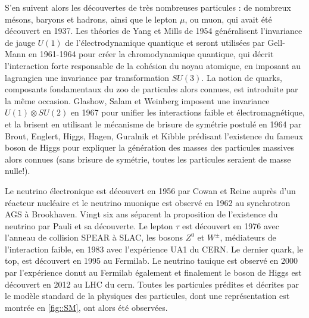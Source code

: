       S'en suivent alors les découvertes de très nombreuses particules : de nombreux mésons, baryons et  hadrons, ainsi que le lepton $\mu$, ou muon, qui avait été découvert en 1937\cite{Street1937}. Les théories de Yang et Mills de 1954\cite{Yang1954} généralisent l'invariance de jauge $U(1)$ de l'électrodynamique quantique et seront utilisées par Gell-Mann en 1961-1964\cite{Glashow1961,Gell-Mann1964} pour créer la chromodynamique quantique, qui décrit l'interaction forte responsable de la cohésion du noyau atomique, en imposant au lagrangien une invariance par transformation $SU(3)$. La notion de quarks, composants fondamentaux du zoo de particules alors connues, est introduite par la même occasion. Glashow, Salam et Weinberg imposent une invariance $U(1)\otimes SU(2)$ en 1967\cite{Glashow1961a,Salam1964,Weinberg1967} pour unifier les interactions faible et électromagnétique, et la brisent en utilisant le mécanisme de brisure de symétrie postulé en 1964 par  Brout, Englert, Higgs, Hagen, Guralnik et Kibble\cite{Englert1964,Higgs1964,Higgs1964a,Kibble1967} prédisant l'existence du fameux boson de Higgs pour expliquer la génération des masses des particules massives alors connues (sans brisure de symétrie, toutes les particules seraient de masse nulle!). 

      Le neutrino électronique est découvert en 1956 par Cowan et Reine\cite{Cowan1956} auprès d'un réacteur nucléaire et le neutrino muonique est observé en 1962\cite{Danby1962} au synchrotron AGS à Brookhaven. Vingt six ans séparent la proposition de l'existence du neutrino par Pauli et sa découverte. Le lepton $\tau$ est découvert en 1976\cite{Perl1975} avec l'anneau de collision SPEAR à SLAC, les bosons $Z^0$ et $W^{\pm}$, médiateurs de l'interaction faible, en 1983\cite{Arnison1983,Arnison1983a} avec l'expérience UA1 du CERN. Le dernier quark, le top, est découvert en 1995\cite{Collaboration1995} au Fermilab. Le neutrino tauique est observé en 2000 par l'expérience \gls{donut}\cite{Collaboration2000} au Fermilab également et finalement le boson de Higgs est découvert en 2012 au LHC du \gls{cern}\cite{Collaboration2012}. Toutes les particules prédites et décrites par le modèle standard de la physiques des particules, dont une représentation est montrée en \autoref{fig::SM}, ont alors été observées. 

